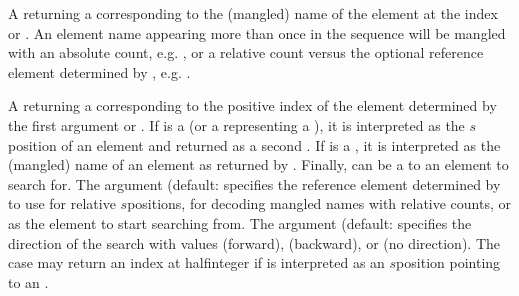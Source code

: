 \documentclass[letterpaper,10pt,english]{sphinxmanual}
\begin{document}
\begin{description}
\sphinxAtStartPar
A   returning a  corresponding to the (mangled) name of the element at the index  or . An element
name appearing more than once in the sequence will be mangled with an absolute count, e.g. , or a relative count versus the optional
reference element  determined by , e.g. .

\sphinxAtStartPar
A   returning a  corresponding to the positive index of the element determined by the first argument or .
If  is a  (or a  representing a ), it is interpreted as the \(s\)\sphinxhyphen{}position of an element and returned as a second
. If  is a , it is interpreted as the (mangled) name of an element as returned by . Finally,  can be a 
to an element to search for. The argument  (default:  specifies the reference element determined by  to use for
relative \(s\)\sphinxhyphen{}positions, for decoding mangled names with relative counts, or as the element to start searching from. The argument 
(default:  specifies the direction of the search with values  (forward),  (backward), or  (no direction). The 
case may return an index at half\sphinxhyphen{}integer if  is interpreted as an \(s\)\sphinxhyphen{}position pointing to an .


\end{description}
\end{document}
